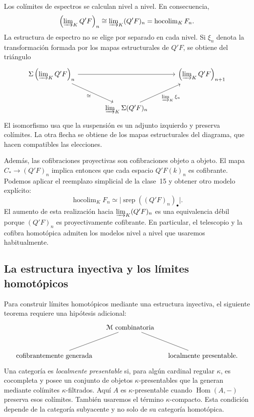 Los colímites de espectros se calculan nivel a nivel. En consecuencia,
\[
\left(\varinjlim\nolimits_K Q'F\right)_n
\cong\varinjlim\nolimits_K (Q'F)_n
=\operatorname{hocolim}_K F_n.
\]
La estructura de espectro no se elige por separado en cada nivel. Si $\xi_n$ denota la transformación formada por los mapas estructurales de $Q'F$, se obtiene del triángulo
\[
\begin{tikzcd}[column sep=large,row sep=large]
\Sigma\left(\varinjlim\nolimits_K Q'F\right)_n
\arrow[rr]\arrow[dr,"\cong"']
&&\left(\varinjlim\nolimits_K Q'F\right)_{n+1}\\
&\varinjlim\nolimits_K\Sigma(Q'F)_n
\arrow[ur,"\varinjlim\nolimits_K\xi_n"']&
\end{tikzcd}
\]
El isomorfismo usa que la suspensión es un adjunto izquierdo y preserva colímites. La otra flecha se obtiene de los mapas estructurales del diagrama, que hacen compatibles las elecciones.

Además, las cofibraciones proyectivas son cofibraciones objeto a objeto. El mapa $C_*\to(Q'F)_n$ implica entonces que cada espacio $Q'F(k)_n$ es cofibrante. Podemos aplicar el reemplazo simplicial de la clase~15 y obtener otro modelo explícito:
\[
\operatorname{hocolim}_K F_n
\simeq\bigl|\operatorname{srep}((Q'F)_n)_\bullet\bigr|.
\]
El aumento de esta realización hacia $\varinjlim\nolimits_K(Q'F)_n$ es una equivalencia débil porque $(Q'F)_n$ es proyectivamente cofibrante. En particular, el telescopio y la cofibra homotópica admiten los modelos nivel a nivel que usaremos habitualmente.

\subsection{La estructura inyectiva y los límites homotópicos}

Para construir límites homotópicos mediante una estructura inyectiva, el siguiente teorema requiere una hipótesis adicional:
\[
\begin{tikzcd}[column sep=small,row sep=large]
&\mathcal M\text{ combinatoria}\arrow[dl,no head]\arrow[dr,no head]&\\
\text{cofibrantemente generada}&&\text{localmente presentable}.
\end{tikzcd}
\]
Una categoría es \emph{localmente presentable} si, para algún cardinal regular $\kappa$, es cocompleta y posee un conjunto de objetos $\kappa$-presentables que la generan mediante colímites $\kappa$-filtrados. Aquí $A$ es $\kappa$-presentable cuando $\operatorname{Hom}(A,-)$ preserva esos colímites. También usaremos el término $\kappa$-compacto. Esta condición depende de la categoría subyacente y no solo de su categoría homotópica.

